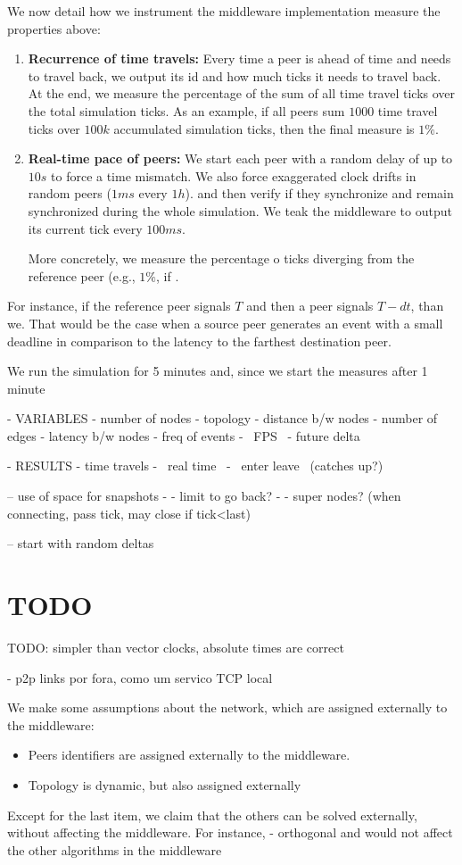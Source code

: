 \documentclass[10pt,journal,compsoc]{IEEEtran}
\begin{document}
We now detail how we instrument the middleware implementation measure the
properties above:
%
\begin{enumerate}
%
\item \textbf{Recurrence of time travels:}
Every time a peer is ahead of time and needs to travel back, we output its id
and how much ticks it needs to travel back.
At the end, we measure the percentage of the sum of all time travel ticks over
the total simulation ticks.
As an example, if all peers sum $1000$ time travel ticks over $100k$
accumulated simulation ticks, then the final measure is $1\%$.
%
\item \textbf{Real-time pace of peers:}
We start each peer with a random delay of up to $10s$ to force a time mismatch.
We also force exaggerated clock drifts in random peers ($1ms$ every $1h$).
and then verify if they synchronize and remain synchronized during the whole
simulation.
We teak the middleware to output its current tick every $100ms$.

More concretely, we measure the percentage o ticks diverging from the reference
peer (e.g., $1\%$, if .

%
\end{enumerate}

For instance, if the reference peer signals $T$ and then a peer signals $T-dt$,
than we.
That would be the case when a source peer generates an event with a small
deadline in comparison to the latency to the farthest destination peer.

We run the simulation for 5 minutes and, since we start the measures after 1 minute

- VARIABLES
- number of nodes
- topology
    - distance b/w nodes
    - number of edges
- latency b/w nodes
- freq of events
- ~FPS~
- future delta

- RESULTS
- time travels
- ~real time~
- ~enter leave~ (catches up?)

-- use of space for snapshots
-    - limit to go back?
-    - super nodes? (when connecting, pass tick, may close if tick<last)

-- start with random deltas
\section{TODO}

TODO: simpler than vector clocks, absolute times are correct

- p2p links por fora, como um servico TCP local

We make some assumptions about the network, which are assigned externally to
the middleware:
%
\begin{itemize}
\item Peers identifiers are assigned externally to the middleware.
\item Topology is dynamic, but also assigned externally

\end{itemize}
%
Except for the last item, we claim that the others can be solved externally,
without affecting the middleware.
For instance,
- orthogonal and would not affect the other algorithms in the middleware
\end{document}
